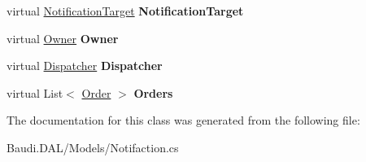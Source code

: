 \begin{DoxyCompactItemize}
\item 
\hypertarget{class_baudi_1_1_d_a_l_1_1_models_1_1_notification_a6ce8fa003daafa0df75f8375d4e81cb8}{}virtual \hyperlink{class_baudi_1_1_d_a_l_1_1_models_1_1_notification_target}{Notification\+Target} {\bfseries Notification\+Target}\label{class_baudi_1_1_d_a_l_1_1_models_1_1_notification_a6ce8fa003daafa0df75f8375d4e81cb8}

\item 
\hypertarget{class_baudi_1_1_d_a_l_1_1_models_1_1_notification_a1c483ed252ef18045695794748675038}{}virtual \hyperlink{class_baudi_1_1_d_a_l_1_1_models_1_1_owner}{Owner} {\bfseries Owner}\label{class_baudi_1_1_d_a_l_1_1_models_1_1_notification_a1c483ed252ef18045695794748675038}

\item 
\hypertarget{class_baudi_1_1_d_a_l_1_1_models_1_1_notification_a7a5842944f51dc96016f0edaf0c60036}{}virtual \hyperlink{class_baudi_1_1_d_a_l_1_1_models_1_1_dispatcher}{Dispatcher} {\bfseries Dispatcher}\label{class_baudi_1_1_d_a_l_1_1_models_1_1_notification_a7a5842944f51dc96016f0edaf0c60036}

\item 
\hypertarget{class_baudi_1_1_d_a_l_1_1_models_1_1_notification_aec41c18ca272b8db4d88c101959590fd}{}virtual List$<$ \hyperlink{class_baudi_1_1_d_a_l_1_1_models_1_1_order}{Order} $>$ {\bfseries Orders}\label{class_baudi_1_1_d_a_l_1_1_models_1_1_notification_aec41c18ca272b8db4d88c101959590fd}

\end{DoxyCompactItemize}


The documentation for this class was generated from the following file\+:\begin{DoxyCompactItemize}
\item 
Baudi.\+D\+A\+L/\+Models/Notifaction.\+cs\end{DoxyCompactItemize}
